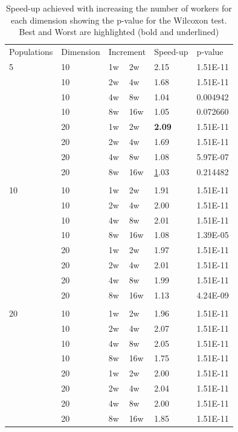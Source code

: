 \documentclass[review]{elsarticle}
\begin{document}
\begin{table}[h!tbp]
  \small
  \caption{Speed-up achieved with increasing the number of workers for
    each dimension showing the p-value for the Wilcoxon test. 
    Best and Worst are highlighted (bold and underlined)}
  \label{tab:speedup:test}
  \vspace{0.25cm}
  \centering
  \begin{tabular}{llllll}
  Populations & Dimension  & \multicolumn{2}{l}{Increment}  & Speed-up            & p-value\\
  5  & 10 & 1w & 2w  & 2.15 & 1.51E-11 \\
  & 10 & 2w & 4w  & 1.68 & 1.51E-11 \\
  & 10 & 4w & 8w  & 1.04 & 0.004942 \\
  & 10 & 8w & 16w & 1.05 & 0.072660 \\
  & 20 & 1w & 2w  & \textbf{2.09} & 1.51E-11 \\
  & 20 & 2w & 4w  & 1.69 & 1.51E-11 \\
  & 20 & 4w & 8w  & 1.08 & 5.97E-07 \\
  & 20 & 8w & 16w & {\ul 1.03} & 0.214482 \\
  &    &    &     &      &          \\
10 & 10 & 1w & 2w  & 1.91 & 1.51E-11 \\
  & 10 & 2w & 4w  & 2.00 & 1.51E-11 \\
  & 10 & 4w & 8w  & 2.01 & 1.51E-11 \\
  & 10 & 8w & 16w & 1.08 & 1.39E-05 \\
  & 20 & 1w & 2w  & 1.97 & 1.51E-11 \\
  & 20 & 2w & 4w  & 2.01 & 1.51E-11 \\
  & 20 & 4w & 8w  & 1.99 & 1.51E-11 \\
  & 20 & 8w & 16w & 1.13 & 4.24E-09 \\
  &    &    &     &      &          \\
 20 & 10 & 1w & 2w  & 1.96 & 1.51E-11 \\
  & 10 & 2w & 4w  & 2.07 & 1.51E-11 \\
  & 10 & 4w & 8w  & 2.05 & 1.51E-11 \\
  & 10 & 8w & 16w & 1.75 & 1.51E-11 \\
  & 20 & 1w & 2w  & 2.00 & 1.51E-11 \\
  & 20 & 2w & 4w  & 2.04 & 1.51E-11 \\
  & 20 & 4w & 8w  & 2.00 & 1.51E-11 \\
  & 20 & 8w & 16w & 1.85 & 1.51E-11 \\
 \end{tabular}
  \end{table}
\end{document}
